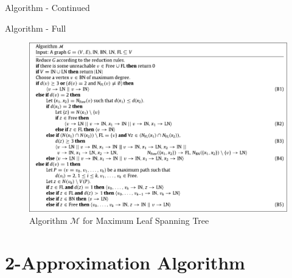 \documentclass{beamer}
\begin{document}
\begin{frame}{Algorithm - Continued}
\begin{algorithm}[H]
\end{algorithm}
\end{frame}

\begin{frame}{Algorithm - Full}
    \begin{figure}
            \centering
            \includegraphics[height=0.85\textheight]{fernau-algo-m-snap.pdf}
            \caption{Algorithm $\mathcal{M}$ for Maximum Leaf Spanning Tree}
            \label{fig:algo-m-full}
        \end{figure}
\end{frame}



\section{2-Approximation Algorithm}
\end{document}
